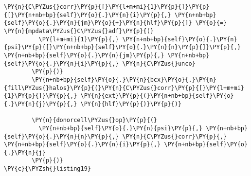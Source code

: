 \begin{Verbatim}[commandchars=\\\{\}]
        \PY{n}{C\PYZus{}corr}\PY{p}{[}\PY{l+m+mi}{1}\PY{p}{]}\PY{p}{[}\PY{n+nb+bp}{self}\PY{o}{.}\PY{n}{i}\PY{p}{,} \PY{n+nb+bp}{self}\PY{o}{.}\PY{n}{jm}\PY{o}{+}\PY{n}{hlf}\PY{p}{]} \PY{o}{=} \PY{n}{mpdata\PYZus{}C\PYZus{}adf}\PY{p}{(}
          \PY{l+m+mi}{1}\PY{p}{,} \PY{n+nb+bp}{self}\PY{o}{.}\PY{n}{psi}\PY{p}{[}\PY{n+nb+bp}{self}\PY{o}{.}\PY{n}{n}\PY{p}{]}\PY{p}{,} \PY{n+nb+bp}{self}\PY{o}{.}\PY{n}{jm}\PY{p}{,} \PY{n+nb+bp}{self}\PY{o}{.}\PY{n}{i}\PY{p}{,} \PY{n}{C\PYZus{}unco}
        \PY{p}{)}
        \PY{n+nb+bp}{self}\PY{o}{.}\PY{n}{bcx}\PY{o}{.}\PY{n}{fill\PYZus{}halos}\PY{p}{(}\PY{n}{C\PYZus{}corr}\PY{p}{[}\PY{l+m+mi}{1}\PY{p}{]}\PY{p}{,} \PY{n}{ext}\PY{p}{(}\PY{n+nb+bp}{self}\PY{o}{.}\PY{n}{j}\PY{p}{,} \PY{n}{hlf}\PY{p}{)}\PY{p}{)}

        \PY{n}{donorcell\PYZus{}op}\PY{p}{(}
          \PY{n+nb+bp}{self}\PY{o}{.}\PY{n}{psi}\PY{p}{,} \PY{n+nb+bp}{self}\PY{o}{.}\PY{n}{n}\PY{p}{,} \PY{n}{C\PYZus{}corr}\PY{p}{,} \PY{n+nb+bp}{self}\PY{o}{.}\PY{n}{i}\PY{p}{,} \PY{n+nb+bp}{self}\PY{o}{.}\PY{n}{j}
        \PY{p}{)}
\PY{c}{\PYZsh{}listing19}
\end{Verbatim}
